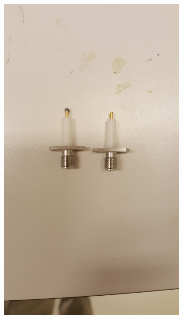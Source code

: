 \documentclass[main.tex]{subfiles}
\begin{document}
\begin{figure}[h]
    \centering
    \begin{subfigure}{0.25\textwidth}
        \centering
        \includegraphics[angle=-90,trim=1200 100 1800 100,clip,width=0.97\linewidth]{figure/Filterbilder/prep_SMA.jpg} 
        \caption{}
        \label{fig:prep_SMA}
    \end{subfigure}
    \begin{subfigure}{0.25\textwidth}
        \centering

\end{subfigure}
\end{figure}
\end{document}
